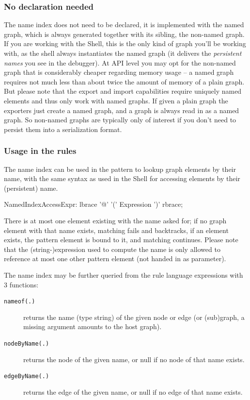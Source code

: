 \subsubsection*{No declaration needed}
The name index does not need to be declared, it is implemented with the named graph, which is always generated together with its sibling, the non-named graph.
If you are working with the Shell, this is the only kind of graph you'll be working with, as the shell always instantiates the named graph (it delivers the \emph{persistent names} you see in the debugger).
At API level you may opt for the non-named graph that is considerably cheaper regarding memory usage -- a named graph requires not much less than about twice the amount of memory of a plain graph.
But please note that the export and import capabilities require uniquely named elements and thus only work with named graphs.
If given a plain graph the exporters just create a named graph, and a graph is always read in as a named graph.
So non-named graphs are typically only of interest if you don't need to persist them into a serialization format.

\subsubsection*{Usage in the rules}
The name index can be used in the pattern to lookup graph elements by their name, with the same syntax as used in the Shell for accessing elements by their (persistent) name.

\begin{rail}
  NamedIndexAccessExpr:
    lbrace '@' '(' Expression ')' rbrace;
\end{rail}

There is at most one element existing with the name asked for; if no graph element with that name exists, matching fails and backtracks, if an element exists, the pattern element is bound to it, and matching continues.
Please note that the (string-)expression used to compute the name is only allowed to reference at most one other pattern element (not handed in as parameter).

The name index may be further queried from the rule language expressions with 3 functions:
\begin{description}
\item[\texttt{nameof(.)}] returns the name (type string) of the given node or edge (or (sub)graph, a missing argument amounts to the host graph).
\item[\texttt{nodeByName(.)}] returns the node of the given name, or null if no node of that name exists.
\item[\texttt{edgeByName(.)}] returns the edge of the given name, or null if no edge of that name exists.
\end{description}

